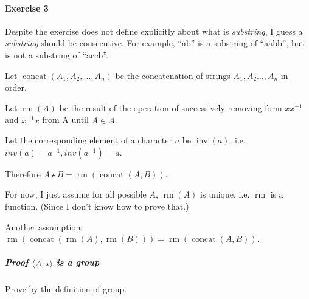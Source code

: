\documentclass[11pt]{article}
\begin{document}
\newpage
\paragraph{Exercise 3}

Despite the exercise does not define explicitly
about what is \textit{substring}, I guess a \textit{substring}
should be consecutive.
For example, ``ab'' is a substring of ``aabb'', but is not a substring of ``accb''.

Let $\mathop{concat}(A_1,A_2,\ldots,A_n)$ be the concatenation of strings
$A_1,A_2\ldots,A_n$ in order.

Let $\mathop{rm}(A)$ be the result of the operation of successively removing form $xx^{-1}$
and $x^{-1}x$ from A until $A \in \tilde{A}$.

Let the corresponding element of a character $a$ be $\mathop{inv}(a)$.
i.e. $inv(a) = a^{-1}, inv(a^{-1}) = a$.

Therefore $A \star B = \mathop{rm}(\mathop{concat}(A,B))$.

For now, I just assume for all possible $A$, $\mathop{rm}(A)$ is unique, i.e. $\mathop{rm}$
is a function. (Since I don't know how to prove that.)

Another assumption: $\mathop{rm}(\mathop{concat}(\mathop{rm}(A),\mathop{rm}(B)))
=\mathop{rm}(\mathop{concat}(A,B))$.


\subparagraph{Proof $\langle \tilde{A}, \star \rangle$ is a group}

Prove by the definition of group.
\end{document}
